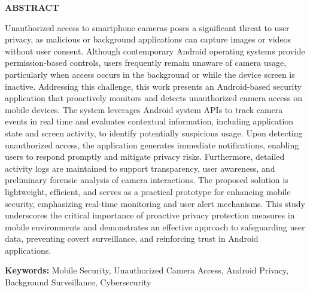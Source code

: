 \documentclass[12pt,a4paper]{report}
\renewcommand{\cftchapdotsep}{\cftdotsep}
\begin{document}
    \begin{center}
        \textbf{\fontsize{18}{22}\selectfont ABSTRACT}
    \end{center}
    \vspace{1cm}
    \noindent\justify
    Unauthorized access to smartphone cameras poses a significant threat to user privacy, as malicious or background applications can capture images or videos without user consent. Although contemporary Android operating systems provide permission-based controls, users frequently remain unaware of camera usage, particularly when access occurs in the background or while the device screen is inactive. Addressing this challenge, this work presents an Android-based security application that proactively monitors and detects unauthorized camera access on mobile devices. The system leverages Android system APIs to track camera events in real time and evaluates contextual information, including application state and screen activity, to identify potentially suspicious usage. Upon detecting unauthorized access, the application generates immediate notifications, enabling users to respond promptly and mitigate privacy risks. Furthermore, detailed activity logs are maintained to support transparency, user awareness, and preliminary forensic analysis of camera interactions. The proposed solution is lightweight, efficient, and serves as a practical prototype for enhancing mobile security, emphasizing real-time monitoring and user alert mechanisms. This study underscores the critical importance of proactive privacy protection measures in mobile environments and demonstrates an effective approach to safeguarding user data, preventing covert surveillance, and reinforcing trust in Android applications.

    \vspace{1cm}
    \noindent \textbf{Keywords:} Mobile Security, Unauthorized Camera Access, Android Privacy, Background Surveillance, Cybersecurity
    \clearpage

    \tableofcontents
    \addtocontents{toc}{\protect\renewcommand{\protect\cftchapleader}{\protect\cftdotfill{\cftchapdotsep}}}
    \clearpage
    \listoffigures
    \clearpage
    \listoftables
    \clearpage

\end{document}
